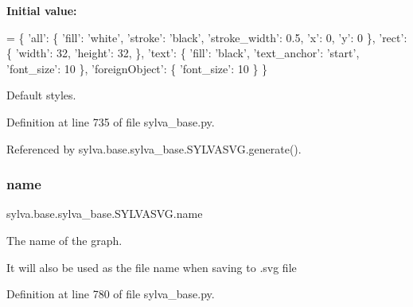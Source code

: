 {\bfseries Initial value\+:}
\begin{DoxyCode}
=  \{
        \textcolor{stringliteral}{'all'}:
        \{
            \textcolor{stringliteral}{'fill'}: \textcolor{stringliteral}{'white'},
            \textcolor{stringliteral}{'stroke'}: \textcolor{stringliteral}{'black'},
            \textcolor{stringliteral}{'stroke\_width'}: 0.5,
            \textcolor{stringliteral}{'x'}: 0,
            \textcolor{stringliteral}{'y'}: 0
        \},
        \textcolor{stringliteral}{'rect'}: \{
            \textcolor{stringliteral}{'width'}: 32,
            \textcolor{stringliteral}{'height'}: 32,
        \},
        \textcolor{stringliteral}{'text'}: \{
            \textcolor{stringliteral}{'fill'}: \textcolor{stringliteral}{'black'},
            \textcolor{stringliteral}{'text\_anchor'}: \textcolor{stringliteral}{'start'},
            \textcolor{stringliteral}{'font\_size'}: 10
        \},
        \textcolor{stringliteral}{'foreignObject'}: \{
            \textcolor{stringliteral}{'font\_size'}: 10
        \}
    \}
\end{DoxyCode}


Default styles. 



Definition at line 735 of file sylva\+\_\+base.\+py.



Referenced by sylva.\+base.\+sylva\+\_\+base.\+S\+Y\+L\+V\+A\+S\+V\+G.\+generate().

\mbox{\label{classsylva_1_1base_1_1sylva__base_1_1_s_y_l_v_a_s_v_g_a645228e918333f1037984d6169079449}} 
\subsubsection{\texorpdfstring{name}{name}}
{\footnotesize\ttfamily sylva.\+base.\+sylva\+\_\+base.\+S\+Y\+L\+V\+A\+S\+V\+G.\+name}



The name of the graph. 

It will also be used as the file name when saving to {\ttfamily .svg} file 

Definition at line 780 of file sylva\+\_\+base.\+py.



